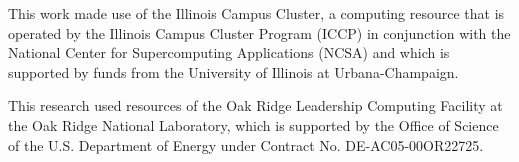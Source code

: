 \begin{frame}
\vfill
\tiny{This work made use of the Illinois Campus Cluster, a computing resource that is operated by the Illinois Campus Cluster Program (ICCP) in conjunction with the National Center for Supercomputing Applications (NCSA) and which is supported by funds from the University of Illinois at Urbana-Champaign.}

\vspace{1ex}
\tiny{This research used resources of the Oak Ridge Leadership Computing Facility at the Oak Ridge National Laboratory, which is supported by the Office of Science of the U.S. Department of Energy under Contract No. DE-AC05-00OR22725.}

\end{frame}
